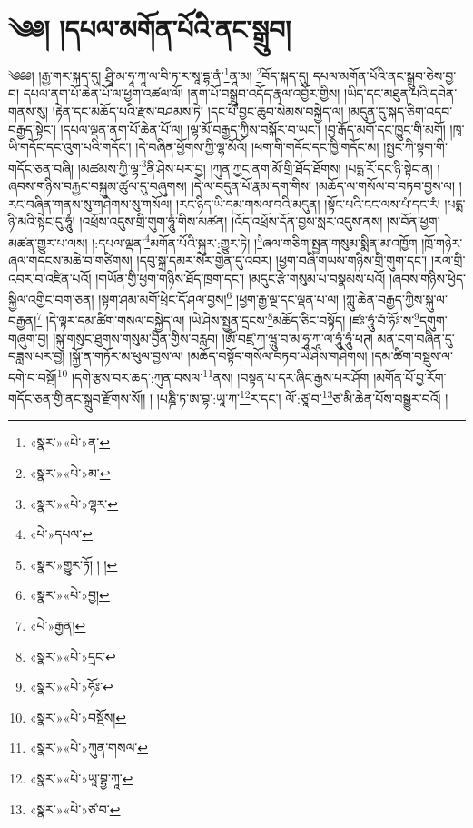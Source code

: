 \chapter{༄༅། །དཔལ་མགོན་པོའི་ནང་སྒྲུབ།}༄༅༅། །རྒྱ་གར་སྐད་དུ། ཤྲཱི་མ་ཧཱ་ཀཱ་ལ་བི་ཏ་ར་སཱ་དྷ་ནཾ་\footnote{«སྣར་»«པེ་»ན་}ནཱ་མ། \footnote{«སྣར་»«པེ་»མ་}བོད་སྐད་དུ། དཔལ་མགོན་པོའི་ནང་སྒྲུབ་ཅེས་བྱ་བ། དཔལ་ནག་པོ་ཆེན་པོ་ལ་ཕྱག་འཚལ་ལོ། །ནག་པོ་བསྒྲུབ་འདོད་རྣལ་འབྱོར་གྱིས། །ཡིད་དང་མཐུན་པའི་དབེན་གནས་སུ། །རྟེན་དང་མཆོད་པའི་རྫས་བཤམས་ཏེ། །དང་པོ་བྱང་ཆུབ་སེམས་བསྐྱེད་ལ། །མདུན་དུ་སྐད་ཅིག་འདབ་བརྒྱད་སྟེང་། །དཔལ་ལྡན་ནག་པོ་ཆེན་པོ་ལ། །ལྷ་མོ་བརྒྱད་ཀྱིས་བསྐོར་བ་ཡང་། །བྱ་རྒོད་མགོ་དང་ཁྱུང་གི་མགོ། །ཁྭ་ཡི་གདོང་དང་འུག་པའི་གདོང་། །དེ་བཞིན་ཕྱོགས་ཀྱི་ལྷ་མོའོ། །ཕག་གི་གདོང་དང་ཁྱི་གདོང་མ། །སྤྱང་ཀི་སྟག་གི་གདོང་ཅན་བཞི། །མཚམས་ཀྱི་ལྷ་\footnote{«སྣར་»«པེ་»ལྷར་}ནི་ཤེས་པར་བྱ། །ཀུན་ཀྱང་ནག་མོ་གྲི་ཐོད་ཐོགས། །པདྨ་རོ་དང་ཉི་སྟེང་ན། །ཞབས་གཉིས་བརྐྱང་བསྐུམ་ཚུལ་དུ་བཞུགས། །དེ་ལ་བདུན་པོ་རྣམ་དག་གིས། །མཆོད་ལ་གསོལ་བ་བཏབ་བྱས་ལ། །རང་བཞིན་གནས་སུ་གཤེགས་སུ་གསོལ། །རང་ཉིད་ཡི་དམ་གསལ་བའི་མདུན། །སྟོང་པའི་ངང་ལས་པཾ་དང་རཾ། །པདྨ་ཉི་མའི་སྟེང་དུ་ཧཱུཾ། །འཕྲོས་འདུས་གྲི་གུག་ཧཱུཾ་གིས་མཚན། །འོད་འཕྲོས་དོན་བྱས་སླར་འདུས་ནས། །ས་བོན་ཕྱག་མཚན་གྱུར་པ་ལས། །:དཔལ་ལྡན་\footnote{«པེ་»དཔལ་}མགོན་པོའི་སྐུར་:གྱུར་ཏེ། །\footnote{«སྣར་»གྱུར་ཏོ། ། །}ཞལ་གཅིག་སྤྱན་གསུམ་སྨིན་མ་འཁྱོག །ཁྲོ་གཉེར་ཞལ་གདངས་མཆེ་བ་གཙིགས། །དབུ་སྐྲ་དམར་སེར་གྱེན་དུ་འབར། །ཕྱག་བཞི་གཡས་གཉིས་གྲི་གུག་དང་། །རལ་གྲི་འབར་བ་འཛིན་པའོ། །གཡོན་གྱི་ཕྱག་གཉིས་ཐོད་ཁྲག་དང་། །མདུང་རྩེ་གསུམ་པ་བསྣམས་པའོ། །ཞབས་གཉིས་ཕྱེད་སྐྱིལ་འགྱིང་བག་ཅན། །སྟག་ཤམ་མགོ་ཕྲེང་དོ་ཤལ་བྱས།\footnote{«སྣར་»«པེ་»བྱ།} །ཕྱག་རྒྱ་ལྔ་དང་ལྡན་པ་ལ། །ཀླུ་ཆེན་བརྒྱད་ཀྱིས་སྐུ་ལ་བརྒྱན།\footnote{«པེ་»རྒྱན།} །དེ་ལྟར་དམ་ཚིག་གསལ་བསྐྱེད་ལ། །ཡེ་ཤེས་སྤྱན་དྲངས་\footnote{«སྣར་»«པེ་»དྲང་}མཆོད་ཅིང་བསྟོད། །ཛཿ་ཧཱུཾ་བཾ་ཧོཿ་ས་\footnote{«སྣར་»«པེ་»ཧོཿ་}དགུག་གཞུག་བྱ། །སྐུ་གསུང་ཐུགས་གསུམ་བྱིན་གྱིས་བརླབ། །ཨོཾ་བཛྲ་ཀ་ཝཱུ་བ་མ་ཧཱ་ཀཱ་ལ་ཧཱུཾ་ཧཱུཾ་ཕཊ། མན་ངག་བཞིན་དུ་བཟླས་པར་བྱ། །སྐྱོ་ན་གཏོར་མ་ཕུལ་བྱས་ལ། །མཆོད་བསྟོད་གསོལ་བཏབ་ཡེ་ཤེས་གཤེགས། །དམ་ཚིག་བསྡུས་ལ་དགེ་བ་བསྔོ།\footnote{«སྣར་»«པེ་»བསྔོས།} །དགེ་རྩས་བར་ཆད་:ཀུན་བསལ་\footnote{«སྣར་»«པེ་»ཀུན་གསལ་}ནས། །བསྟན་པ་དར་ཞིང་རྒྱས་པར་ཤོག །མགོན་པོ་བྱ་རོག་གདོང་ཅན་གྱི་ནང་སྒྲུབ་རྫོགས་སོ།། །
།པཎྜི་ཏ་ཨ་བྷ་:ཡཱ་ཀ་\footnote{«སྣར་»«པེ་»ཡཱ་བྷྱ་ཀཱ་}ར་དང་། ལོ་:ཙཱ་བ་\footnote{«སྣར་»«པེ་»ཙ་བ་}ཙ་མི་ཆེན་པོས་བསྒྱུར་བའོ། ། 